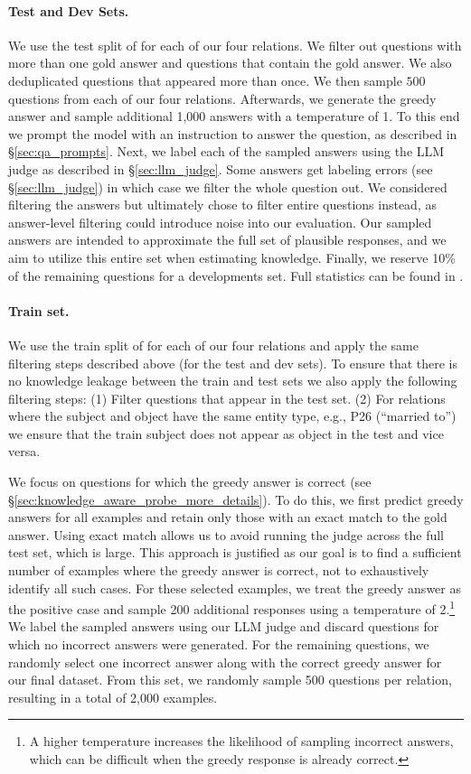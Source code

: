 \paragraph{Test and Dev Sets.} We use the test split of \eq for each of our four relations. We filter out questions with more than one gold answer and questions that contain the gold answer. We also deduplicated questions that appeared more than once.
We then 
sample $500$ questions from each of our four relations. Afterwards, we generate the greedy answer and sample additional 1,000 answers with a temperature of 1. To this end we prompt the model with an instruction to answer the question, as described in \S \ref{sec:qa_prompts}. Next, we label each of the sampled answers using the LLM judge as described in \S \ref{sec:llm_judge}. Some answers get labeling errors (see \S \ref{sec:llm_judge}) in which case we filter the whole question out.
We considered filtering the answers but ultimately chose to filter entire questions instead, as answer-level filtering could introduce noise into our evaluation. Our sampled answers are intended to approximate the full set of plausible responses, and we aim to utilize this entire set when estimating knowledge.
Finally, we reserve 10\% of the remaining questions for a developments set.
Full statistics can be found in .



\paragraph{Train set.}
We use the train split of \eq for each of our four relations and apply the same filtering steps described above (for the test and dev sets). To ensure that there is no knowledge leakage between the train and test sets we also apply the following filtering steps: (1) Filter questions that appear in the test set. (2) For relations where the subject and object have the same entity type, e.g., P26 (``married to'') we ensure that the train subject does not appear as object in the test and vice versa.

We focus on questions for which the greedy answer is correct (see \S \ref{sec:knowledge_aware_probe_more_details}). To do this, we first predict greedy answers for all examples and retain only those with an exact match to the gold answer. Using exact match allows us to avoid running the judge across the full test set, which is large. This approach is justified as our goal is to find a sufficient number of examples where the greedy answer is correct, not to exhaustively identify all such cases.
For these selected examples, we treat the greedy answer as the positive case and sample 200 additional responses using a temperature of 2.\footnote{A higher temperature increases the likelihood of sampling incorrect answers, which can be difficult when the greedy response is already correct.} We label the sampled answers using our LLM judge and discard questions for which no incorrect answers were generated. For the remaining questions, we randomly select one incorrect answer along with the correct greedy answer for our final dataset. From this set, we randomly sample 500 questions per relation, resulting in a total of 2,000 examples.

